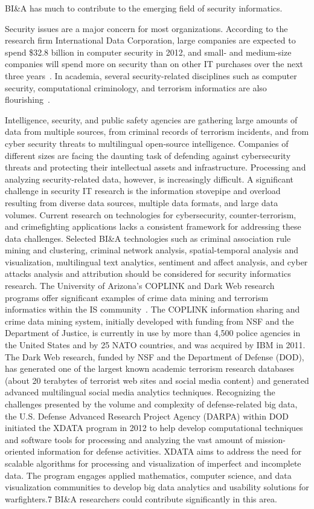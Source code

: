 BI\&A has much to contribute to the emerging field of security
informatics.

Security issues are a major concern for most organizations.
According to the research firm International Data Corporation,
large companies are expected to spend \$32.8 billion in
computer security in 2012, and small- and medium-size
companies will spend more on security than on other IT
purchases over the next three years~\cite{Perlroth:2012}.
In academia, several security-related disciplines such as
computer security, computational criminology, and terrorism
informatics are also flourishing~\cite{Brantingham:2011}.

Intelligence, security, and public safety agencies are gathering
large amounts of data from multiple sources, from criminal
records of terrorism incidents, and from cyber security threats
to multilingual open-source intelligence. Companies of different
sizes are facing the daunting task of defending against
cybersecurity threats and protecting their intellectual assets
and infrastructure. Processing and analyzing security-related
data, however, is increasingly difficult. A significant challenge
in security IT research is the information stovepipe and
overload resulting from diverse data sources, multiple data
formats, and large data volumes. Current research on technologies
for cybersecurity, counter-terrorism, and crimefighting
applications lacks a consistent framework for
addressing these data challenges. Selected BI\&A technologies
such as criminal association rule mining and clustering,
criminal network analysis, spatial-temporal analysis and
visualization, multilingual text analytics, sentiment and affect
analysis, and cyber attacks analysis and attribution should be
considered for security informatics research.
The University of Arizona’s COPLINK and Dark Web
research programs offer significant examples of crime data
mining and terrorism informatics within the IS community~\cite{Chen:2006}. The COPLINK information sharing and crime data mining system, initially developed with funding
from NSF and the Department of Justice, is currently in use
by more than 4,500 police agencies in the United States and
by 25 NATO countries, and was acquired by IBM in 2011.
The Dark Web research, funded by NSF and the Department
of Defense (DOD), has generated one of the largest known
academic terrorism research databases (about 20 terabytes of
terrorist web sites and social media content) and generated
advanced multilingual social media analytics techniques.
Recognizing the challenges presented by the volume and
complexity of defense-related big data, the U.S. Defense
Advanced Research Project Agency (DARPA) within DOD
initiated the XDATA program in 2012 to help develop computational
techniques and software tools for processing and
analyzing the vast amount of mission-oriented information for
defense activities. XDATA aims to address the need for
scalable algorithms for processing and visualization of
imperfect and incomplete data. The program engages applied
mathematics, computer science, and data visualization communities
to develop big data analytics and usability solutions
for warfighters.7
BI\&A researchers could contribute significantly
in this area.

